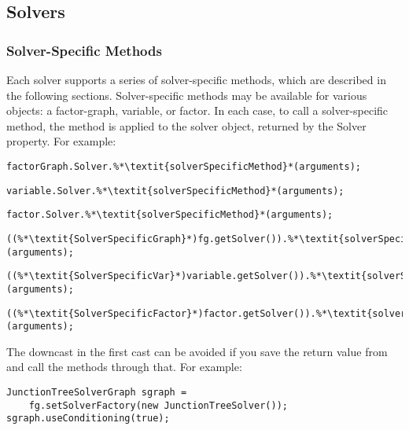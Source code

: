 \subsection{Solvers}
\label{sec:SolversAPI}

\subsubsection{Solver-Specific Methods}

Each solver supports a series of solver-specific methods, which are described in the following sections.  Solver-specific methods may be available for various objects: a factor-graph, variable, or factor.  In each case, to call a solver-specific method, the method is applied to the solver object, returned by the Solver property.  For example:

\ifmatlab
\begin{lstlisting}
factorGraph.Solver.%*\textit{solverSpecificMethod}*(arguments);
\end{lstlisting}

\begin{lstlisting}
variable.Solver.%*\textit{solverSpecificMethod}*(arguments);
\end{lstlisting}

\begin{lstlisting}
factor.Solver.%*\textit{solverSpecificMethod}*(arguments);
\end{lstlisting}
\fi

\ifjava
\begin{lstlisting}
((%*\textit{SolverSpecificGraph}*)fg.getSolver()).%*\textit{solverSpecificMethod}*(arguments);
\end{lstlisting}

\begin{lstlisting}
((%*\textit{SolverSpecificVar}*)variable.getSolver()).%*\textit{solverSpecificMethod}*(arguments);
\end{lstlisting}

\begin{lstlisting}
((%*\textit{SolverSpecificFactor}*)factor.getSolver()).%*\textit{solverSpecificMethod}*(arguments);
\end{lstlisting}

The downcast in the first cast can be avoided if you save the return value from  and call the methods through that. For example:

\begin{lstlisting}
JunctionTreeSolverGraph sgraph =
    fg.setSolverFactory(new JunctionTreeSolver());
sgraph.useConditioning(true);
\end{lstlisting}

